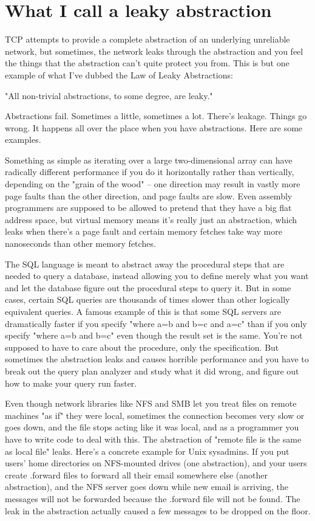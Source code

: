 \documentclass{article}
\begin{document}
\section{What I call a leaky abstraction}
 TCP attempts to provide a complete abstraction of an underlying unreliable network, but sometimes, the network leaks through the abstraction and you feel the things that the abstraction can't quite protect you from. This is but one example of what I've dubbed the Law of Leaky Abstractions:

"All non-trivial abstractions, to some degree, are leaky."

Abstractions fail. Sometimes a little, sometimes a lot. There's leakage. Things go wrong. It happens all over the place when you have abstractions. Here are some examples.

\begin{compactitem}
\item Something as simple as iterating over a large two-dimensional array can have radically different performance if you do it horizontally rather than vertically, depending on the "grain of the wood" -- one direction may result in vastly more page faults than the other direction, and page faults are slow. Even assembly programmers are supposed to be allowed to pretend that they have a big flat address space, but virtual memory means it's really just an abstraction, which leaks when there's a page fault and certain memory fetches take way more nanoseconds than other memory fetches.
\item The SQL language is meant to abstract away the procedural steps that are needed to query a database, instead allowing you to define merely what you want and let the database figure out the procedural steps to query it. But in some cases, certain SQL queries are thousands of times slower than other logically equivalent queries. A famous example of this is that some SQL servers are dramatically faster if you specify "where a=b and b=c and a=c" than if you only specify "where a=b and b=c" even though the result set is the same. You're not supposed to have to care about the procedure, only the specification. But sometimes the abstraction leaks and causes horrible performance and you have to break out the query plan analyzer and study what it did wrong, and figure out how to make your query run faster.
\item Even though network libraries like NFS and SMB let you treat files on remote machines "as if" they were local, sometimes the connection becomes very slow or goes down, and the file stops acting like it was local, and as a programmer you have to write code to deal with this. The abstraction of "remote file is the same as local file" leaks. Here's a concrete example for Unix sysadmins. If you put users' home directories on NFS-mounted drives (one abstraction), and your users create .forward files to forward all their email somewhere else (another abstraction), and the NFS server goes down while new email is arriving, the messages will not be forwarded because the .forward file will not be found. The leak in the abstraction actually caused a few messages to be dropped on the floor.

\end{compactitem}
\end{document}
